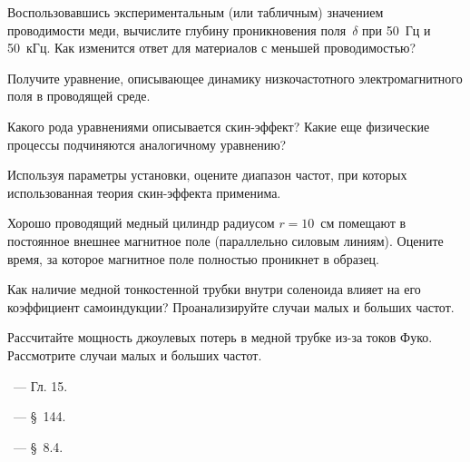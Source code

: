 \begin{lab:questions}
\item Воспользовавшись экспериментальным (или табличным) значением 
проводимости меди, вычислите глубину проникновения поля~$\delta$ 
при 50~Гц и 50~кГц. Как изменится ответ для материалов с меньшей 
проводимостью?

\item Получите уравнение, описывающее динамику низкочастотного электромагнитного 
поля в проводящей среде.

\item Какого рода уравнениями описывается скин-эффект? Какие еще физические
процессы подчиняются аналогичному уравнению?

\item Используя параметры установки, оцените диапазон частот, 
при которых использованная теория скин-эффекта применима.

\item Хорошо проводящий медный цилиндр радиусом $r=10$~см помещают в постоянное внешнее магнитное поле
(параллельно силовым линиям). Оцените время, за которое магнитное поле полностью проникнет в образец.

\item Как наличие медной тонкостенной трубки внутри соленоида влияет 
на его коэффициент самоиндукции?
Проанализируйте случаи малых и больших частот.

\item Рассчитайте мощность джоулевых потерь в медной трубке из-за токов Фуко.
Рассмотрите случаи малых и больших частот.
%

%
%

\end{lab:questions}


\begin{lab:literature}
\item \Kirichenko~--- Гл. 15.

\item \SivuhinIII~--- \S~144.

\item \KingLokOlh~--- \S~8.4.
\end{lab:literature}
